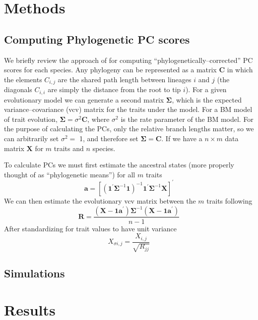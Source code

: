 \documentclass[a4paper,12pt]{article}
\begin{document}
\section{Methods}
\subsection{Computing Phylogenetic PC scores}
We briefly review the approach of \citet{Revell2008} for computing ``phylogenetically--corrected'' PC scores for each species. Any phylogeny can be represented as a matrix $\mathbf{C}$ in which the elements $C_{i,j}$ are the shared path length between lineages $i$ and $j$ (the diagonals $C_{i,i}$ are simply the distance from the root to tip $i$). For a given evolutionary model we can generate a second matrix $\mathbf{\Sigma}$, which is the expected variance--covariance (vcv) matrix for the traits under the model. For a BM model of trait evolution, $\mathbf{\Sigma}=\sigma^2 \mathbf{C}$, where $\sigma^2$ is the rate parameter of the BM model. For the purpose of calculating the PCs, only the relative branch lengths matter, so we can arbitrarily set $\sigma^2=$ 1, and therefore set $\mathbf{\Sigma} = \mathbf{C}$. If we have a $n \times m$ data matrix $\mathbf{X}$ for $m$ traits and $n$ species.

To calculate PCs we must first estimate the ancestral states (more properly thought of as ``phylogenetic means'') for all $m$ traits  
\begin{equation}\label{eq:a}
\mathbf{a}=[(\mathbf{1}^\prime \mathbf{\Sigma}^{-1} \mathbf{1})^{-1} 
\mathbf{1}^\prime \mathbf{\Sigma}^{-1} \mathbf{X}]^\prime
\end{equation}
We can then estimate the evolutionary vcv matrix between the $m$ traits following \citet{RevellHarmon2008}
\begin{equation}\label{eq:r}
\mathbf{R} = \frac{(\mathbf{X} - \mathbf{1a}^\prime ) \mathbf{\Sigma}^{-1} 
(\mathbf{X} - \mathbf{1a}^\prime )}{n-1}
\end{equation}
After standardizing for trait values to have unit variance
\begin{equation}
X_{\sigma i,j} = \frac{X_{i,j}}{\sqrt{R_{jj}}}
\end{equation} 

\subsection{Simulations}

\section{Results}
\end{document}
